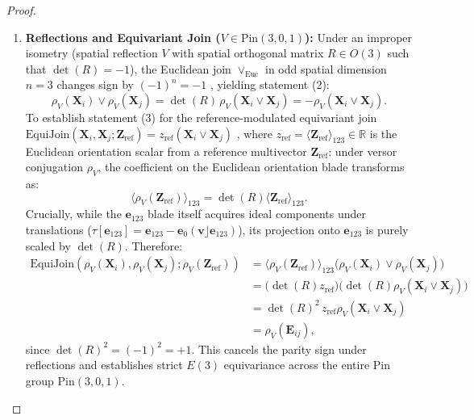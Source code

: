 \documentclass[10pt]{article}
\begin{document}
\begin{proof}
\begin{enumerate}
    \item \textbf{Reflections and Equivariant Join ($V \in \mathrm{Pin}(3,0,1)$):}
    Under an improper isometry (spatial reflection $V$ with spatial orthogonal matrix $R \in O(3)$ such that $\det(R) = -1$), the Euclidean join $\vee_{\mathrm{Euc}}$ in odd spatial dimension $n=3$ changes sign by $(-1)^n = -1$ \citep[Lemma~5]{gatr}, yielding statement (2):
    \begin{equation}
        \rho_V(\mathbf{X}_i) \vee \rho_V(\mathbf{X}_j) = \det(R) \, \rho_V(\mathbf{X}_i \vee \mathbf{X}_j) = -\rho_V(\mathbf{X}_i \vee \mathbf{X}_j).
    \end{equation}
    To establish statement (3) for the reference-modulated equivariant join $\mathrm{EquiJoin}(\mathbf{X}_i, \mathbf{X}_j; \mathbf{Z}_{\text{ref}}) = z_{\text{ref}} (\mathbf{X}_i \vee \mathbf{X}_j)$ \citep{gatr}, where $z_{\text{ref}} = \langle \mathbf{Z}_{\text{ref}} \rangle_{123} \in \mathbb{R}$ is the Euclidean orientation scalar from a reference multivector $\mathbf{Z}_{\text{ref}}$: under versor conjugation $\rho_V$, the coefficient on the Euclidean orientation blade transforms as:
    \begin{equation}
        \langle \rho_V(\mathbf{Z}_{\text{ref}}) \rangle_{123} = \det(R) \langle \mathbf{Z}_{\text{ref}} \rangle_{123}.
    \end{equation}
    Crucially, while the $\mathbf{e}_{123}$ blade itself acquires ideal components under translations ($\tau[\mathbf{e}_{123}] = \mathbf{e}_{123} - \mathbf{e}_0 (\mathbf{v} \rfloor \mathbf{e}_{123})$), its projection onto $\mathbf{e}_{123}$ is purely scaled by $\det(R)$. Therefore:
    \begin{align}
        \mathrm{EquiJoin}(\rho_V(\mathbf{X}_i), \rho_V(\mathbf{X}_j); \rho_V(\mathbf{Z}_{\text{ref}}))
        &= \langle \rho_V(\mathbf{Z}_{\text{ref}}) \rangle_{123} \big( \rho_V(\mathbf{X}_i) \vee \rho_V(\mathbf{X}_j) \big) \nonumber \\
        &= \big( \det(R) z_{\text{ref}} \big) \big( \det(R) \rho_V(\mathbf{X}_i \vee \mathbf{X}_j) \big) \nonumber \\
        &= \det(R)^2 \, z_{\text{ref}} \rho_V(\mathbf{X}_i \vee \mathbf{X}_j) \nonumber \\
        &= \rho_V(\mathbf{E}_{ij}),
    \end{align}
    since $\det(R)^2 = (-1)^2 = +1$. This cancels the parity sign under reflections and establishes strict $E(3)$ equivariance across the entire Pin group $\mathrm{Pin}(3,0,1)$.
\end{enumerate}
\end{proof}
\end{document}
